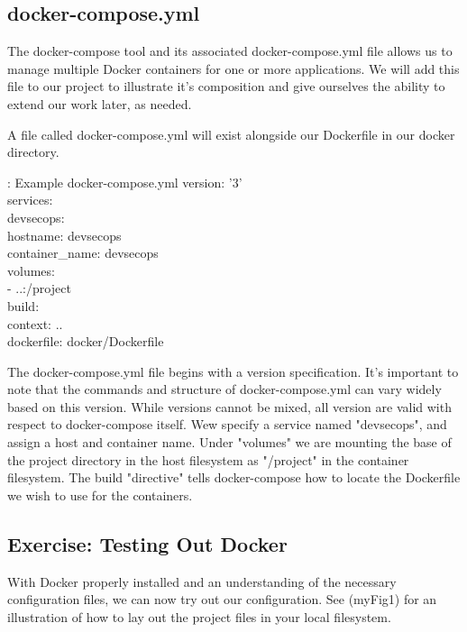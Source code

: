 \subsection{docker-compose.yml}
\justify
The docker-compose tool and its associated docker-compose.yml file
allows us to manage multiple Docker containers for one or more
applications. We will add this file to our project to illustrate it's
composition and give ourselves the ability to extend our work later, as
needed.

\justify
A file called docker-compose.yml will exist alongside our Dockerfile in our docker directory.

\begin{mybox}{\thetcbcounter: Example docker-compose.yml}
version: '3'\\
services:\\
\hspace*{7mm}devsecops:\\
\hspace*{15mm}hostname: devsecops\\
\hspace*{15mm}container\_name: devsecops\\
\hspace*{7mm}volumes:\\
\hspace*{15mm}- ..:/project\\
\hspace*{7mm}build:\\
\hspace*{15mm}context: ..\\
\hspace*{15mm}dockerfile: docker/Dockerfile
\end{mybox}

\justify
The docker-compose.yml file begins with a version specification. It's
important to note that the commands and structure of docker-compose.yml
can vary widely based on this version. While versions cannot be mixed,
all version are valid with respect to docker-compose itself. Wew specify
a service named "devsecops", and assign a host and container name. Under
"volumes" we are mounting the base of the project directory in the host
filesystem as "/project" in the container filesystem. The build
"directive" tells docker-compose how to locate the Dockerfile we wish to
use for the containers.

\subsection{Exercise: Testing Out Docker}
\justify
With Docker properly installed and an understanding of the necessary
configuration files, we can now try out our configuration. See
({myFig1}) for an illustration of how to lay out the project files in your local filesystem.

